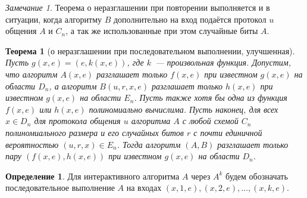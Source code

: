 \documentclass[12pt,a4paper]{article}
\theoremstyle{definition}
\newtheorem{definition}{Определение}[section]
\theoremstyle{plain}
\newtheorem{theorem}{Теорема}[section]
\theoremstyle{remark}
\newtheorem{remark}{Замечание}[section]
\begin{document}
\begin{remark}
Теорема о неразглашении при повторении выполняется и в ситуации, когда
алгоритму $B$ дополнительно на вход подаётся протокол $u$ общения $A$ и $C_n$,
а так же использованные при этом случайные биты $A$.
\end{remark}
\begin{theorem}[о неразглашении при последовательном выполнении, улучшенная]
Пусть $g(x,e) = (e, k(x,e))$, где $k$~--- произвольная функция.
Допустим, что алгоритм $A(x,e)$ разглашает только $f(x,e)$ при
известном $g(x,e)$ на области $D_n$, а алгоритм $B(u, r, x,e)$ разглашает
только $h(x,e)$ при известном $g(x,e)$ на области $E_n$.
Пусть также хотя бы одна из функция $f(x,e)$ или $h(x,e)$ полиномиально
вычислима. Пусть наконец, для всех $x\in D_n$ для протокола общения
$u$ алгоритма $A$ с любой схемой $C_n$ полиномиального размера и его случайных битов $r$
с почти единичной вероятностью $(u,r,x)\in E_n$. 
Тогда алгоритм $(A,B)$ разглашает только пару $(f(x,e),h(x,e))$
при известном $g(x,e)$ на области $D_n$.
\end{theorem}

\begin{definition}
Для интерактивного алгоритма $A$ через $A^{k}$ будем обозначать 
последовательное выполнение $A$ на входах $(x,1,e),(x,2,e),\dotsc,(x,k,e)$.
\end{definition}
\end{document}
